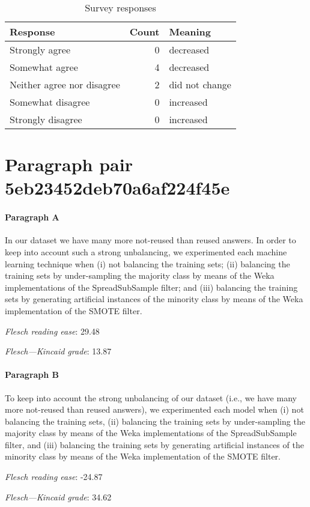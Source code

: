 \begin{table}[!h]
\centering
\begin{tabular}{lrl}
\toprule
          \textbf{Response} &  \textbf{Count} & \textbf{Meaning} \\
\midrule
             Strongly agree &               0 &        decreased \\
             Somewhat agree &               4 &        decreased \\
 Neither agree nor disagree &               2 &   did not change \\
          Somewhat disagree &               0 &        increased \\
          Strongly disagree &               0 &        increased \\
\bottomrule
\end{tabular}
\caption*{Survey responses}\end{table}


\newpage
\section{Paragraph pair 5eb23452deb70a6af224f45e}
\paragraph{Paragraph A}
In our dataset we have many more not-reused than reused answers. In order to keep into account such a strong unbalancing, we experimented each machine learning technique when (i) not balancing the training sets; (ii) balancing the training sets by under-sampling the majority class by means of the Weka implementations of the SpreadSubSample filter; and (iii) balancing the training sets by generating artificial instances of the minority class by means of the Weka implementation of the SMOTE filter.\par\medskip
\emph{Flesch reading ease}: 29.48\par
\emph{Flesch---Kincaid grade}: 13.87

\paragraph{Paragraph B}
To keep into account the strong unbalancing of our dataset (i.e., we have many more not-reused than reused answers), we experimented each model when (i) not balancing the training sets, (ii) balancing the training sets by under-sampling the majority class by means of the Weka implementations of the SpreadSubSample filter, and (iii) balancing the training sets by generating artificial instances of the minority class by means of the Weka implementation of the SMOTE filter.\par\medskip
\emph{Flesch reading ease}: -24.87\par
\emph{Flesch---Kincaid grade}: 34.62

